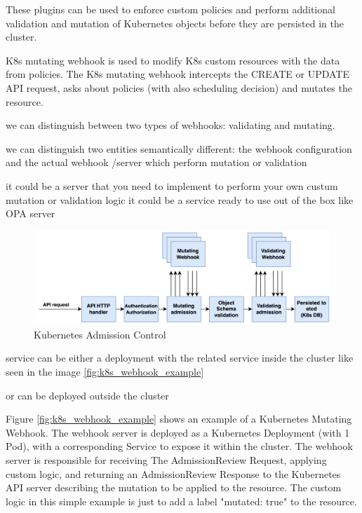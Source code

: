These plugins can be used to enforce custom policies and perform additional validation and mutation of Kubernetes objects before they are persisted in the cluster.

K8s mutating webhook is used to modify K8s custom resources with the data from policies. 
The K8s mutating webhook intercepts the CREATE or UPDATE API request, asks about policies (with also scheduling decision) and mutates the resource.

we can distinguish between two types of webhooks: validating and mutating.

we can distinguish two entities semantically different: the webhook configuration and the actual webhook /server which perform mutation or validation

it could be a server that you need to implement to perform your own custum mutation or validation logic
it could be a service ready to use out of the box like OPA server

\begin{figure}[htb]
  \centering
  \includegraphics[width=1\linewidth]{images/k8s_admission.png}
  \caption{Kubernetes Admission Control}
  \label{fig:k8s_admission_control}
\end{figure}


service can be either a deployment with the related service inside the cluster like seen in the image \ref{fig:k8s_webhook_example}

or can be deployed outside the cluster

Figure \ref{fig:k8s_webhook_example} shows an example of a Kubernetes Mutating Webhook. The webhook server is deployed as a Kubernetes Deployment (with 1 Pod), with a corresponding Service to expose it within the cluster. The webhook server is responsible for receiving The AdmissionReview Request, applying custom logic, and returning an AdmissionReview Response to the Kubernetes API server describing the mutation to be applied to the resource.
The custom logic in this simple example is just to add a label "mutated: true" to the resource.

